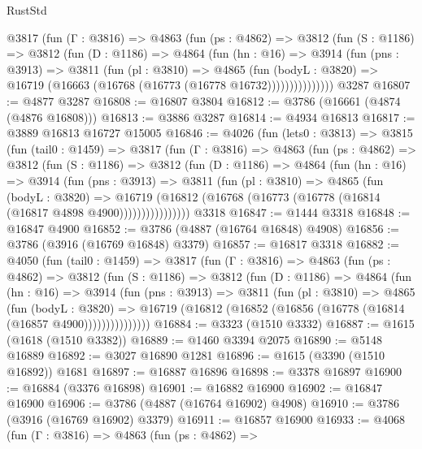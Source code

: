 \begin{lexlean}{RustStd}
\begin{coremodule}
        @3817
          (fun (Γ : @3816) =>
          @4863
            (fun (ps : @4862) =>
            @3812
              (fun (S : @1186) =>
              @3812
                (fun (D : @1186) =>
                @4864
                  (fun (hn : @16) =>
                  @3914
                    (fun (pns : @3913) =>
                    @3811
                      (fun (pl : @3810) =>
                      @4865
                        (fun (bodyL : @3820) =>
                        @16719 (@16663 (@16768 (@16773 (@16778 @16732)))))))))))))))
    @3287
@16807 := @4877 @3287
@16808 := @16807 @3804
@16812 := @3786 (@16661 (@4874 (@4876 @16808)))
@16813 := @3886 @3287
@16814 := @4934 @16813
@16817 := @3889 @16813 @16727 @15005
@16846 := @4026
    (fun (lets0 : @3813) =>
    @3815
      (fun (tail0 : @1459) =>
      @3817
        (fun (Γ : @3816) =>
        @4863
          (fun (ps : @4862) =>
          @3812
            (fun (S : @1186) =>
            @3812
              (fun (D : @1186) =>
              @4864
                (fun (hn : @16) =>
                @3914
                  (fun (pns : @3913) =>
                  @3811
                    (fun (pl : @3810) =>
                    @4865
                      (fun (bodyL : @3820) =>
                      @16719
                        (@16812 (@16768 (@16773 (@16778 (@16814 (@16817 @4898 @4900))))))))))))))))
    @3318
@16847 := @1444 @3318
@16848 := @16847 @4900
@16852 := @3786 (@4887 (@16764 @16848) @4908)
@16856 := @3786 (@3916 (@16769 @16848) @3379)
@16857 := @16817 @3318
@16882 := @4050
    (fun (tail0 : @1459) =>
    @3817
      (fun (Γ : @3816) =>
      @4863
        (fun (ps : @4862) =>
        @3812
          (fun (S : @1186) =>
          @3812
            (fun (D : @1186) =>
            @4864
              (fun (hn : @16) =>
              @3914
                (fun (pns : @3913) =>
                @3811
                  (fun (pl : @3810) =>
                  @4865
                    (fun (bodyL : @3820) =>
                    @16719 (@16812 (@16852 (@16856 (@16778 (@16814 (@16857 @4900)))))))))))))))
@16884 := @3323 (@1510 @3332)
@16887 := @1615 (@1618 (@1510 @3382))
@16889 := @1460 @3394 @2075
@16890 := @5148 @16889
@16892 := @3027 @16890 @1281
@16896 := @1615 (@3390 (@1510 @16892)) @1681
@16897 := @16887 @16896
@16898 := @3378 @16897
@16900 := @16884 (@3376 @16898)
@16901 := @16882 @16900
@16902 := @16847 @16900
@16906 := @3786 (@4887 (@16764 @16902) @4908)
@16910 := @3786 (@3916 (@16769 @16902) @3379)
@16911 := @16857 @16900
@16933 := @4068
    (fun (Γ : @3816) =>
    @4863
      (fun (ps : @4862) =>

\end{coremodule}
\end{lexlean}
